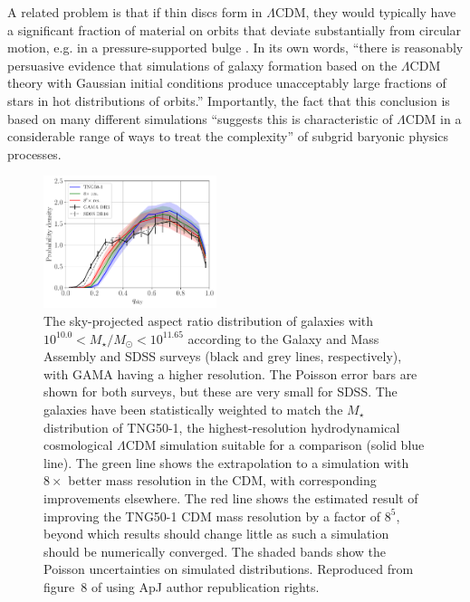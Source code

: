 \documentclass[fleqn,usenatbib,useAMS,onecolumn]{mnras} %
\begin{document}
A related problem is that if thin discs form in $\Lambda$CDM, they would typically have a significant fraction of material on orbits that deviate substantially from circular motion, e.g. in a pressure-supported bulge \citep{Peebles_2020}. In its own words, ``there is reasonably persuasive evidence that simulations of galaxy formation based on the $\Lambda$CDM theory with Gaussian initial conditions produce unacceptably large fractions of stars in hot distributions of orbits.'' Importantly, the fact that this conclusion is based on many different simulations ``suggests this is characteristic of $\Lambda$CDM in a considerable range of ways to treat the complexity'' of subgrid baryonic physics processes.

\begin{figure}
	\centering
	\includegraphics[width=0.45\textwidth]{TNG50_aspect_ratio_quadratic_extrapolation_Ms1000_1165}
	\caption{The sky-projected aspect ratio distribution of galaxies with $10^{10.0} < M_{\star}/M_\odot < 10^{11.65}$ according to the Galaxy and Mass Assembly \citep[GAMA;][]{Driver_2009, Driver_2011} and SDSS surveys (black and grey lines, respectively), with GAMA having a higher resolution. The Poisson error bars are shown for both surveys, but these are very small for SDSS. The galaxies have been statistically weighted to match the $M_{\star}$ distribution of TNG50-1, the highest-resolution hydrodynamical cosmological $\Lambda$CDM simulation suitable for a comparison (solid blue line). The green line shows the extrapolation to a simulation with $8\times$ better mass resolution in the CDM, with corresponding improvements elsewhere. The red line shows the estimated result of improving the TNG50-1 CDM mass resolution by a factor of $8^5$, beyond which results should change little as such a simulation should be numerically converged. The shaded bands show the Poisson uncertainties on simulated distributions. Reproduced from figure~8 of \citet{Haslbauer_2022} using ApJ author republication rights.}
	\label{TNG50_aspect_ratio_quadratic_extrapolation_Ms1000_1165}
\end{figure}
\end{document}
